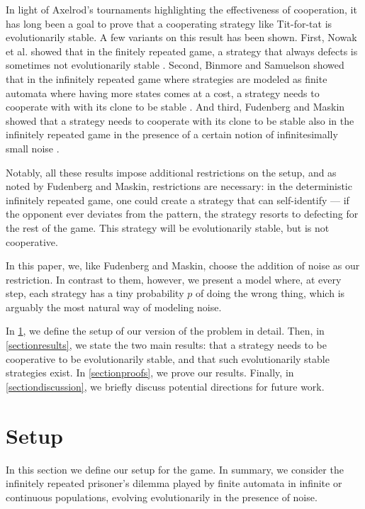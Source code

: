 \documentclass[12pt]{article}
\theoremstyle{definition}
\theoremstyle{remark}
\begin{document}
In light of Axelrod's tournaments highlighting the effectiveness of cooperation, it has long been a goal to prove that a cooperating strategy like Tit-for-tat is evolutionarily stable. A few variants on this result has been shown. First, Nowak et al. showed that in the finitely repeated game, a strategy that always defects is sometimes not evolutionarily stable \cite{nowak2004emergence}. Second, Binmore and Samuelson showed that in the infinitely repeated game where strategies are modeled as finite automata where having more states comes at a cost, a strategy needs to cooperate with with its clone to be stable \cite{binmore1992evolutionary}. And third, Fudenberg and Maskin showed that a strategy needs to cooperate with its clone to be stable also in the infinitely repeated game in the presence of a certain notion of infinitesimally small noise \cite{fundenberg1990evolution}.

Notably, all these results impose additional restrictions on the setup, and as noted by Fudenberg and Maskin, restrictions are necessary: in the deterministic infinitely repeated game, one could create a strategy that can self-identify — if the opponent ever deviates from the pattern, the strategy resorts to defecting for the rest of the game. This strategy will be evolutionarily stable, but is not cooperative. 

In this paper, we, like Fudenberg and Maskin, choose the addition of noise as our restriction. In contrast to them, however, we present a model where, at every step, each strategy has a tiny probability $p$ of doing the wrong thing, which is arguably the most natural way of modeling noise. 

In \cref{sectionsetup}, we define the setup of our version of the problem in detail. Then, in \cref{sectionresults}, we state the two main results: that a strategy needs to be cooperative to be evolutionarily stable, and that such evolutionarily stable strategies exist. In \cref{sectionproofs}, we prove our results. Finally, in \cref{sectiondiscussion}, we briefly discuss potential directions for future work.

\section{Setup}
\label{sectionsetup}

In this section we define our setup for the game. In summary, we consider the infinitely repeated prisoner's dilemma played by finite automata in infinite or continuous populations, evolving evolutionarily in the presence of noise.
\end{document}
